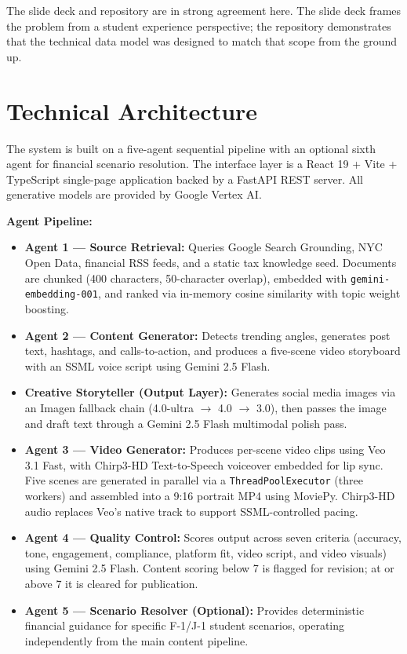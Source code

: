 \documentclass[12pt, letterpaper]{article}
\begin{document}
The slide deck and repository are in strong agreement here. The slide deck frames the
problem from a student experience perspective; the repository demonstrates that the
technical data model was designed to match that scope from the ground up.

\section{Technical Architecture}

The system is built on a five-agent sequential pipeline with an optional sixth agent
for financial scenario resolution. The interface layer is a React 19 + Vite +
TypeScript single-page application backed by a FastAPI REST server. All generative
models are provided by Google Vertex AI.

\textbf{Agent Pipeline:}
\begin{itemize}[leftmargin=1.5em]
  \item \textbf{Agent 1 --- Source Retrieval:} Queries Google Search Grounding, NYC
    Open Data, financial RSS feeds, and a static tax knowledge seed. Documents are
    chunked (400 characters, 50-character overlap), embedded with
    \texttt{gemini-embedding-001}, and ranked via in-memory cosine similarity with
    topic weight boosting.
  \item \textbf{Agent 2 --- Content Generator:} Detects trending angles, generates
    post text, hashtags, and calls-to-action, and produces a five-scene video storyboard
    with an SSML voice script using Gemini 2.5 Flash.
  \item \textbf{Creative Storyteller (Output Layer):} Generates social media images
    via an Imagen fallback chain (4.0-ultra $\to$ 4.0 $\to$ 3.0), then passes the
    image and draft text through a Gemini 2.5 Flash multimodal polish pass.
  \item \textbf{Agent 3 --- Video Generator:} Produces per-scene video clips using
    Veo 3.1 Fast, with Chirp3-HD Text-to-Speech voiceover embedded for lip sync.
    Five scenes are generated in parallel via a \texttt{ThreadPoolExecutor} (three
    workers) and assembled into a 9:16 portrait MP4 using MoviePy. Chirp3-HD audio
    replaces Veo's native track to support SSML-controlled pacing.
  \item \textbf{Agent 4 --- Quality Control:} Scores output across seven criteria
    (accuracy, tone, engagement, compliance, platform fit, video script, and video
    visuals) using Gemini 2.5 Flash. Content scoring below 7 is flagged for revision;
    at or above 7 it is cleared for publication.
  \item \textbf{Agent 5 --- Scenario Resolver (Optional):} Provides deterministic
    financial guidance for specific F-1/J-1 student scenarios, operating independently
    from the main content pipeline.
\end{itemize}
\end{document}

